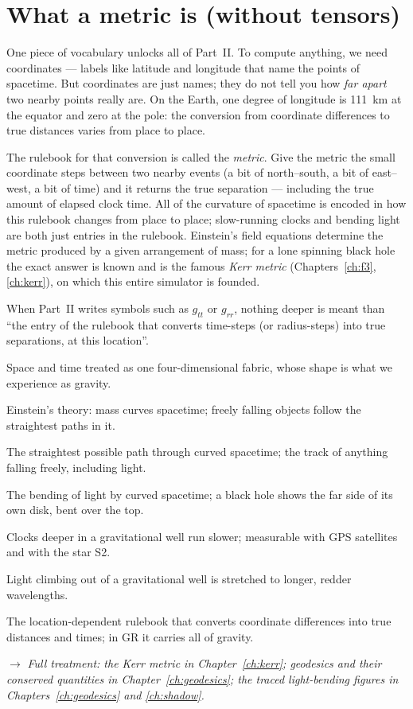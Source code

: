 \section{What a metric is (without tensors)}

One piece of vocabulary unlocks all of Part~II. To compute anything, we
need coordinates — labels like latitude and longitude that name the points
of spacetime. But coordinates are just names; they do not tell you how
\emph{far apart} two nearby points really are. On the Earth, one degree of
longitude is 111~km at the equator and zero at the pole: the conversion
from coordinate differences to true distances varies from place to place.

The rulebook for that conversion is called the \emph{metric}. Give the
metric the small coordinate steps between two nearby events (a bit of
north--south, a bit of east--west, a bit of time) and it returns the true
separation — including the true amount of elapsed clock time. All of the
curvature of spacetime is encoded in how this rulebook changes from place
to place; slow-running clocks and bending light are both just entries in
the rulebook. Einstein's field equations determine the metric produced by
a given arrangement of mass; for a lone spinning black hole the exact
answer is known and is the famous \emph{Kerr metric}
(Chapters~\ref{ch:f3}, \ref{ch:kerr}), on which this entire simulator is
founded.

When Part~II writes symbols such as $g_{tt}$ or $g_{r r}$, nothing deeper
is meant than ``the entry of the rulebook that converts time-steps (or
radius-steps) into true separations, at this location''.

\begin{termsbox}
\item[Spacetime] Space and time treated as one four-dimensional fabric,
whose shape is what we experience as gravity.
\item[General relativity (GR)] Einstein's theory: mass curves spacetime;
freely falling objects follow the straightest paths in it.
\item[Geodesic] The straightest possible path through curved spacetime;
the track of anything falling freely, including light.
\item[Gravitational lensing] The bending of light by curved spacetime; a
black hole shows the far side of its own disk, bent over the top.
\item[Time dilation] Clocks deeper in a gravitational well run slower;
measurable with GPS satellites and with the star S2.
\item[Gravitational redshift] Light climbing out of a gravitational well
is stretched to longer, redder wavelengths.
\item[Metric] The location-dependent rulebook that converts coordinate
differences into true distances and times; in GR it carries all of
gravity.
\end{termsbox}

\noindent$\rightarrow$ \emph{Full treatment: the Kerr metric in
Chapter~\ref{ch:kerr}; geodesics and their conserved quantities in
Chapter~\ref{ch:geodesics}; the traced light-bending figures in
Chapters~\ref{ch:geodesics} and \ref{ch:shadow}.}
